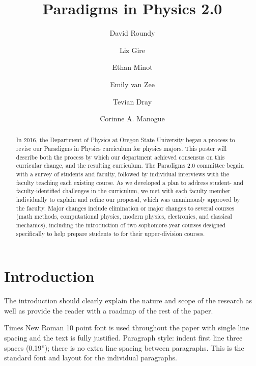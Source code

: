 \documentclass[english,aps,pra,reprint,noshowpacs,superscriptaddress]{revtex4-1}
\begin{document}
\title{Paradigms in Physics 2.0}
\author{David Roundy}
\author{Liz Gire}
\author{Ethan Minot}
\author{Emily van Zee}
\author{Tevian Dray}
\author{Corinne A. Manogue}


\begin{abstract}
In 2016, the Department of Physics at Oregon State University began a
process to revise our Paradigms in Physics curriculum for physics
majors.  This poster will describe both the process by which our
department achieved consensus on this curricular change, and the
resulting curriculum.  The Paradigms 2.0 committee begain with a
survey of students and faculty, followed by individual interviews with
the faculty teaching each existing course.  As we developed a plan to
address student- and faculty-identified challenges in the curriculum,
we met with each faculty member individually to explain and refine our
proposal, which was unanimously approved by the faculty.  Major
changes include elimination or major changes to several courses (math
methods, computational physics, modern physics, electronics, and
classical mechanics), including the introduction of two sophomore-year
courses designed specifically to help prepare students to for their
upper-division courses.
\end{abstract}

\maketitle

\section{Introduction}
The introduction should clearly explain the nature and scope of the research as well as provide the reader with a roadmap of the rest of the paper.
	
Times New Roman 10 point font is used throughout the paper with single line spacing and the text is fully justified.  Paragraph style: indent first line three spaces (0.19''); there is no extra line spacing between paragraphs.  This is the standard font and layout for the individual paragraphs. %
\end{document}
